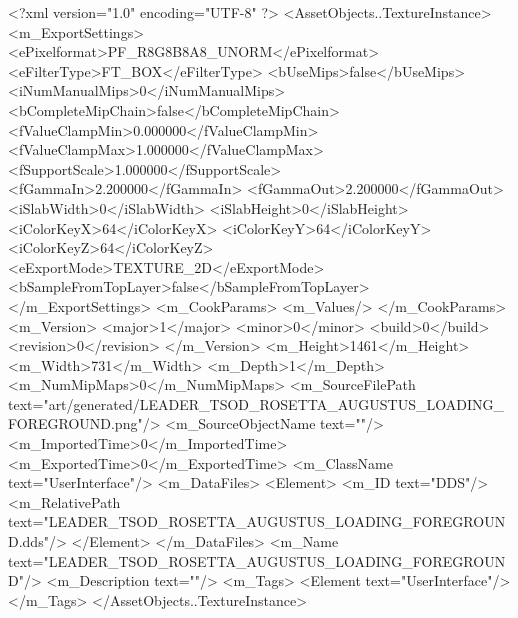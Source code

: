 <?xml version="1.0" encoding="UTF-8" ?>
<AssetObjects..TextureInstance>
	<m_ExportSettings>
		<ePixelformat>PF_R8G8B8A8_UNORM</ePixelformat>
		<eFilterType>FT_BOX</eFilterType>
		<bUseMips>false</bUseMips>
		<iNumManualMips>0</iNumManualMips>
		<bCompleteMipChain>false</bCompleteMipChain>
		<fValueClampMin>0.000000</fValueClampMin>
		<fValueClampMax>1.000000</fValueClampMax>
		<fSupportScale>1.000000</fSupportScale>
		<fGammaIn>2.200000</fGammaIn>
		<fGammaOut>2.200000</fGammaOut>
		<iSlabWidth>0</iSlabWidth>
		<iSlabHeight>0</iSlabHeight>
		<iColorKeyX>64</iColorKeyX>
		<iColorKeyY>64</iColorKeyY>
		<iColorKeyZ>64</iColorKeyZ>
		<eExportMode>TEXTURE_2D</eExportMode>
		<bSampleFromTopLayer>false</bSampleFromTopLayer>
	</m_ExportSettings>
	<m_CookParams>
		<m_Values/>
	</m_CookParams>
	<m_Version>
		<major>1</major>
		<minor>0</minor>
		<build>0</build>
		<revision>0</revision>
	</m_Version>
	<m_Height>1461</m_Height>
	<m_Width>731</m_Width>
	<m_Depth>1</m_Depth>
	<m_NumMipMaps>0</m_NumMipMaps>
	<m_SourceFilePath text="art/generated/LEADER_TSOD_ROSETTA_AUGUSTUS_LOADING_FOREGROUND.png"/>
	<m_SourceObjectName text=""/>
	<m_ImportedTime>0</m_ImportedTime>
	<m_ExportedTime>0</m_ExportedTime>
	<m_ClassName text="UserInterface"/>
	<m_DataFiles>
		<Element>
			<m_ID text="DDS"/>
			<m_RelativePath text="LEADER_TSOD_ROSETTA_AUGUSTUS_LOADING_FOREGROUND.dds"/>
		</Element>
	</m_DataFiles>
	<m_Name text="LEADER_TSOD_ROSETTA_AUGUSTUS_LOADING_FOREGROUND"/>
	<m_Description text=""/>
	<m_Tags>
		<Element text="UserInterface"/>
	</m_Tags>
</AssetObjects..TextureInstance>
